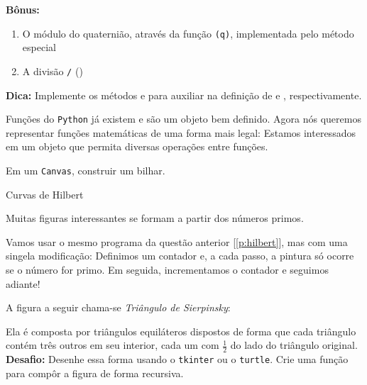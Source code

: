 \documentclass[12pt]{article}
\begin{document}
	\textbf{Bônus:}
	\begin{enumerate}
		\item O módulo do quaternião, através da função \texttt{(q)}, implementada pelo método especial 
		\item A divisão \texttt{\slash} ()
	\end{enumerate}

	\textbf{Dica:} Implemente os métodos  e  para auxiliar na definição de  e , respectivamente.
	
	
	Funções do \texttt{Python} já existem e são um objeto bem definido. Agora nós queremos representar funções matemáticas de uma forma mais legal: Estamos interessados em um objeto que permita diversas operações entre funções.
	
	

	\quest Em um \texttt{Canvas}, construir um bilhar.
	
	
	\label{p:hilbert}
	
	Curvas de Hilbert	
	
	
	Muitas figuras interessantes se formam a partir dos números primos.
	
	\quest Vamos usar o mesmo programa da questão anterior [\ref{p:hilbert}], mas com uma singela modificação: Definimos um contador e, a cada passo, a pintura só ocorre se o número for primo. Em seguida, incrementamos o contador e seguimos adiante!
	
	
	
		
	
	A figura a seguir chama-se \emph{Triângulo de Sierpinsky}:
	

	Ela é composta por triângulos equiláteros dispostos de forma que cada triângulo contém três outros em seu interior, cada um com $\frac{1}{2}$ do lado do triângulo original.\\
	
	\textbf{Desafio:} Desenhe essa forma usando o \texttt{tkinter} ou o \texttt{turtle}. Crie uma função para compôr a figura de forma recursiva.
	
\end{document}
